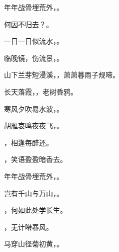 \documentclass[12pt, a4paper, addpoints, answers]{exam}
\begin{document}
\begin{questions}
\question[3] 年年战骨埋荒外，\fillin 。

   

 

\question[3] 何因不归去？\fillin 。

   

 

\question[3] 一日一日似流水，\fillin 。

   

 

\question[3] 临晚镜，伤流景，\fillin 。

   

 

\question[3] 山下兰芽短浸溪，\fillin ，萧萧暮雨子规啼。

   

 

\question[3] 长天落霞，\fillin ，老树昏鸦。

   

 

\question[3] 寒风夕吹易水波，\fillin 。

   

 

\question[3] 胡雁哀鸣夜夜飞，\fillin 。

   

 

\question[3] \fillin ，相逢每醉还。

   

 

\question[3] \fillin ，笑语盈盈暗香去。

   

 

\question[3] 年年战骨埋荒外，\fillin 。

   

 

\question[3] 岂有千山与万山，\fillin 。

   

 

\question[3] \fillin ，何如此处学长生。

   

 

\question[3] \fillin ，无计啭春风。

   

 

\question[3] 马穿山径菊初黄，\fillin 。

   

 


\end{questions}
\end{document}
